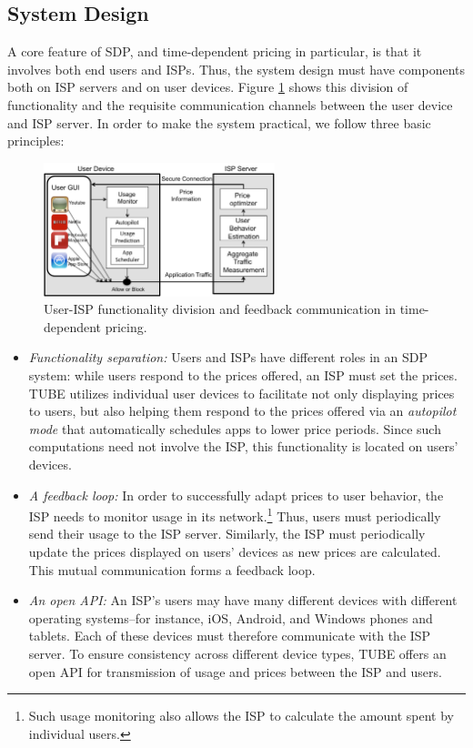 \subsection{System Design}

A core feature of SDP, and time-dependent pricing in particular, is that it involves both end users and ISPs. Thus, the system design must have components both on ISP servers and on user devices. Figure 
\ref{fig:tdp_arch} shows this division of functionality and the requisite communication channels between the user device and ISP server. In order to make the system practical, we follow three basic principles:

\begin{figure}
\centering
\includegraphics[width = 0.6\textwidth]{Figures/TDP_Architecture.pdf}
\caption{User-ISP functionality division and feedback communication in time-dependent pricing.}
\label{fig:tdp_arch}
\end{figure}

\begin{itemize}
\item
\emph{Functionality separation:} Users and ISPs have different roles in an SDP system: while users respond to the prices offered, an ISP must set the prices. TUBE utilizes individual user devices to facilitate not only displaying prices to users, but also helping them respond to the prices offered via an \emph{autopilot mode} that automatically schedules apps to lower price periods. Since such computations need not involve the ISP, this functionality is located on users' devices.
\item
\emph{A feedback loop:} In order to successfully adapt prices to user behavior, the ISP needs to monitor usage in its network.\footnote{Such usage monitoring also allows the ISP to calculate the amount spent by individual users.} Thus, users must periodically send their usage to the ISP server. Similarly, the ISP must periodically update the prices displayed on users' devices as new prices are calculated. This mutual communication forms a feedback loop.
\item
\emph{An open API:} An ISP's users may have many different devices with different operating systems--for instance, iOS, Android, and Windows phones and tablets. Each of these devices must therefore communicate with the ISP server. To ensure consistency across different device types, TUBE offers an open API for transmission of usage and prices between the ISP and users.
\end{itemize}

